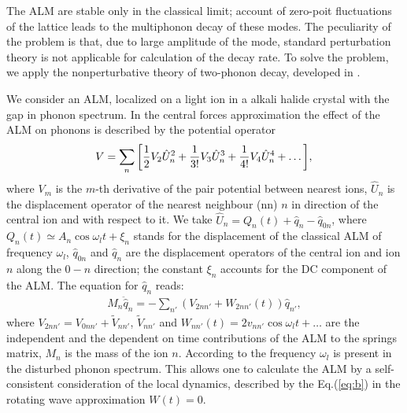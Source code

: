 \documentclass{kapproc}
\begin{document}
The ALM are stable only in the classical limit; account
of zero-poit fluctuations of the lattice leads to the multiphonon decay
of these modes. The peculiarity  of the problem is that, due to large
amplitude of the mode,
standard perturbation theory is not applicable for calculation
of the decay rate. To solve the problem, we
apply the nonperturbative theory of two-phonon decay,
developed in  \cite{hizhrev,hizhnev}.


We consider an ALM, localized on a light ion
in a alkali halide crystal with the gap in phonon spectrum.
In the central forces approximation the effect of the ALM  on
phonons is described by the potential operator
\begin{equation}
V  =  \sum_n \bigg[
\frac{1}{2} V_2 \hat{U}^2_n +
\frac{1}{3!} V_3  \hat{U}^3_n  +
\frac{1}{4!} V_4  \hat{U}^4_n + \ldots \bigg],
\nonumber \\
\end{equation}
where  $V_m$ is the $m$-th derivative of the
pair potential between nearest ions,
$\hat{U}_n$ is  the displacement
operator of the  nearest  neighbour (nn) $n$ in direction of the central ion
and with respect to it.
We take  $\hat{U}_n=Q_n (t) + \hat{q}_n -
\hat{q}_{0n}$, where $Q_n (t)\simeq A_n \cos{\omega_l t} + \xi_n$
stands for the displacement of the
classical ALM of frequency $\omega_l$,
$\hat{q}_{0n}$ and $\hat{q}_n$  are the  displacement
operators of
the central ion and ion $n$ along the $0-n$ direction;
the constant $\xi_n$ accounts for the DC component of the ALM.
The equation for $\hat{q}_{n}$ reads:
\begin{eqnarray}
M_n \ddot{\hat{q}}_{n}= -
\sum_{n'} ( V_{2 n n'}+W_{2 n n'} (t)) \hat{q}_{n'},
\label{eq:b}
\end{eqnarray}
where $V_{2 n n'} = V_{0nn'} + \tilde{V}_{nn'}$,
$\tilde{V}_{ n n'}$ and
$W_{n n'}(t) =  2 v_{n n'}\cos{\omega_{l} t} + \ldots$
are the independent and the dependent on time contributions of the ALM to
the springs matrix, $M_n$ is the mass of the ion $n$.
According to \cite{electronic}
the frequency  $\omega_l$
is present in the disturbed
phonon spectrum. This allows one to calculate the ALM by a self-consistent
consideration of the local dynamics, described by the
Eq.(\ref{eq:b}) in the rotating wave approximation $W(t)=0$.
\end{document}
